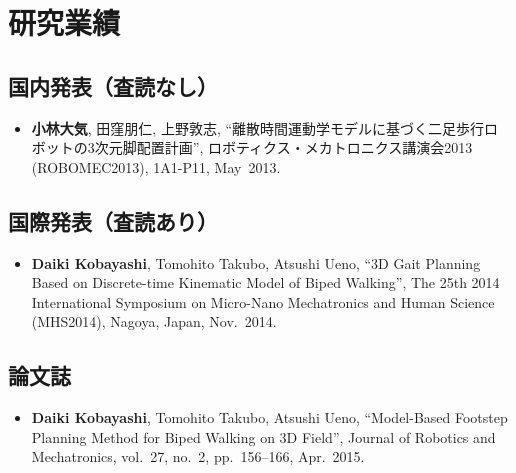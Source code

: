 \documentclass[autodetect-engine,dvipdfmx-if-dvi,ja=standard,a4j,jbase=11pt,magstyle=nomag*]{bxjsreport}
\begin{document}
{
\onehalfspacing

\chapter*{研究業績}

\section*{国内発表（査読なし）}
\begin{itemize}
        \item   \textbf{小林大気}, 田窪朋仁, 上野敦志,
                ``離散時間運動学モデルに基づく二足歩行ロボットの3次元脚配置計画'',
                ロボティクス・メカトロニクス講演会2013 (ROBOMEC2013), 1A1-P11, May~2013.
\end{itemize}

\section*{国際発表（査読あり）}
\begin{itemize}
        \item   \textbf{Daiki Kobayashi}, Tomohito Takubo, Atsushi Ueno,
                ``3D Gait Planning Based on Discrete-time Kinematic Model of Biped Walking'',
                The 25th 2014 International Symposium on Micro-Nano Mechatronics and Human Science (MHS2014), Nagoya, Japan, Nov.~2014.
\end{itemize}

\section*{論文誌}
\begin{itemize}
        \item   \textbf{Daiki Kobayashi}, Tomohito Takubo, Atsushi Ueno,
                ``Model-Based Footstep Planning Method for Biped Walking on 3D Field'',
                Journal of Robotics and Mechatronics, vol.~27, no.~2, pp.~156--166, Apr.~2015.
\end{itemize}

}
\end{document}

